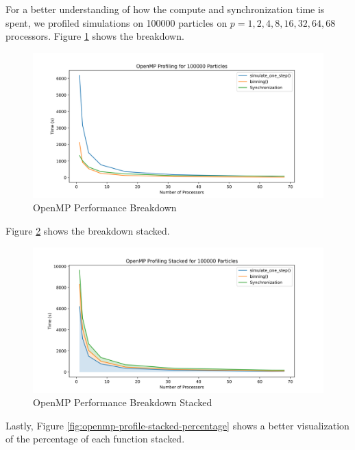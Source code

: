\documentclass{article}
\begin{document}
For a better understanding of how the compute and synchronization time is spent, we profiled simulations on 100000 particles on $p = {1, 2, 4, 8, 16, 32, 64, 68}$ processors. Figure \ref{fig:openmp-profile} shows the breakdown.

\begin{figure}[H]
	\centering
	\includegraphics[width=6in]{figures/openmp_profiling.png}
	\caption{OpenMP Performance Breakdown}
	\label{fig:openmp-profile}
\end{figure}

Figure \ref{fig:openmp-profile-stacked} shows the breakdown stacked.

\begin{figure}[H]
	\centering
	\includegraphics[width=6in]{figures/openmp_profiling_stacked.png}
	\caption{OpenMP Performance Breakdown Stacked}
	\label{fig:openmp-profile-stacked}
\end{figure}

Lastly, Figure \ref{fig:openmp-profile-stacked-percentage} shows a better visualization of the percentage of each function stacked.
\end{document}
